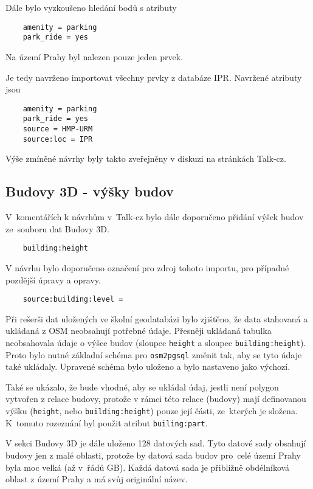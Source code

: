 Dále bylo vyzkoušeno hledání bodů s atributy
\begin{verbatim}
    amenity = parking
    park_ride = yes
\end{verbatim}
Na území Prahy byl nalezen pouze jeden prvek.

Je tedy navrženo importovat všechny prvky z databáze IPR.
Navržené atributy jsou
\begin{verbatim}
    amenity = parking
    park_ride = yes
    source = HMP-URM
    source:loc = IPR
\end{verbatim}

Výše zmíněné návrhy byly takto zveřejněny v diskuzi na stránkách
Talk-cz.

\subsection{Budovy 3D - výšky budov}
\label{Budovy 3D - výšky budov}
V~komentářích k návrhům v~Talk-cz bylo dále doporučeno přidání
výšek budov ze~souboru dat Budovy 3D.
\begin{verbatim}
    building:height
\end{verbatim}
V návrhu bylo doporučeno označení pro zdroj tohoto importu, pro případné pozdější úpravy a opravy.
\begin{verbatim}
    source:building:level =
\end{verbatim}

Při rešerši dat uložených ve školní geodatabázi bylo zjištěno,
že data stahovaná a ukládaná z OSM neobsahují potřebné údaje.
Přesněji ukládaná tabulka neobsahovala údaje o výšce budov
(sloupec {\tt height} a sloupec {\tt building\::height}).
Proto bylo nutné základní schéma pro {\tt osm2pgsql} změnit tak, aby se tyto údaje také 
ukládaly. Upravené schéma bylo uloženo a bylo nastaveno jako výchozí.

Také se ukázalo, že bude vhodné, aby se ukládal údaj, jestli
není polygon vytvořen z relace budovy, protože v rámci této relace
(budovy) mají definovanou výšku ({\tt height}, nebo
{\tt building\::height}) pouze její části, ze~kterých je složena.
K~tomuto rozeznání byl použit atribut {\tt builing\::part}.

V sekci Budovy 3D je dále uloženo 128 datových sad. Tyto datové sady obsahují budovy jen z malé oblasti, protože
by datová sada budov pro~celé území Prahy byla moc velká (až v~řádů
GB). Každá datová sada je přibližně obdélníková oblast z území Prahy a
má svůj originální název.

